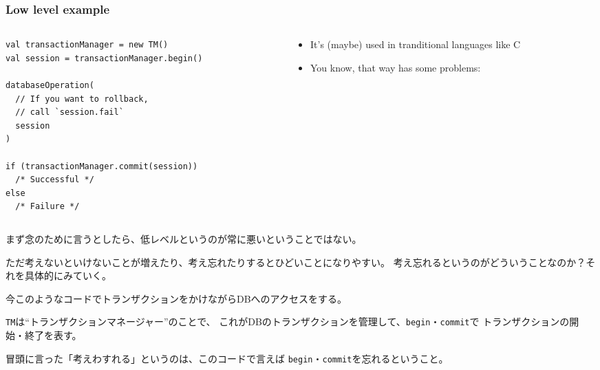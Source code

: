\begin{frame}[fragile]
  \frametitle{Low level example}

  \begin{columns}
    \begin{column}{0.5\textwidth}
      \pause
\begin{lstlisting}[style=scala]
val transactionManager = new TM()
val session = transactionManager.begin()

databaseOperation(
  // If you want to rollback,
  // call `session.fail`
  session
)

if (transactionManager.commit(session))
  /* Successful */
else
  /* Failure */   
\end{lstlisting}
    \end{column}
    \begin{column}{0.5\textwidth}

      \pause
      \begin{itemize}
        \item<+-> It's (maybe) used in tranditional languages like C
       
        \item<+-> You know, that way has some problems:
      \end{itemize}
    \end{column}
  \end{columns}



  \begin{notes}
    \item まず念のために言うとしたら、低レベルというのが常に悪いということではない。

    \item ただ考えないといけないことが増えたり、考え忘れたりするとひどいことになりやすい。
    考え忘れるというのがどういうことなのか？それを具体的にみていく。

    \item 今このようなコードでトランザクションをかけながらDBへのアクセスをする。

    \item \lstinline|TM|は``トランザクションマネージャー''のことで、
    これがDBのトランザクションを管理して、\lstinline|begin|・\lstinline|commit|で
    トランザクションの開始・終了を表す。

    \item 冒頭に言った「考えわすれる」というのは、このコードで言えば
    \lstinline|begin|・\lstinline|commit|を忘れるということ。
  \end{notes}
\end{frame}


